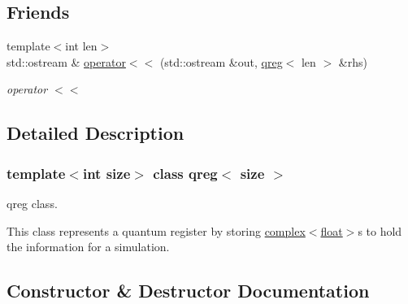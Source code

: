 \subsection*{Friends}
\begin{DoxyCompactItemize}
\item 
{\footnotesize template$<$int len$>$ }\\std\+::ostream \& \hyperlink{classqreg_aab37e2039c27c6a674f5319cb72b0a6f}{operator$<$$<$} (std\+::ostream \&out, \hyperlink{classqreg}{qreg}$<$ len $>$ \&rhs)
\begin{DoxyCompactList}\small\item\em operator $<$$<$ \end{DoxyCompactList}\end{DoxyCompactItemize}


\subsection{Detailed Description}
\subsubsection*{template$<$int size$>$\newline
class qreg$<$ size $>$}

qreg class. 

This class represents a quantum register by storing \hyperlink{classcomplex}{complex$<$float$>$}s to hold the information for a simulation. 

\subsection{Constructor \& Destructor Documentation}
\mbox{\label{classqreg_af90cf81369c4ec6058038497f7a1c870}} 
